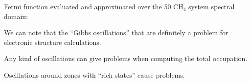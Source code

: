 Fermi function evaluated and approximated over the 50 CH$_4$ system spectral domain:
   \begin{center}
   \end{center}  
We can note that the ``Gibbs oscillations'' that are definitely a problem for electronic structure calculations. 


Any kind of oscillations can give problems when computing the total occupation.
   \begin{center}
   \end{center}  
Oscillations around zones with ``rich states'' cause problems.

